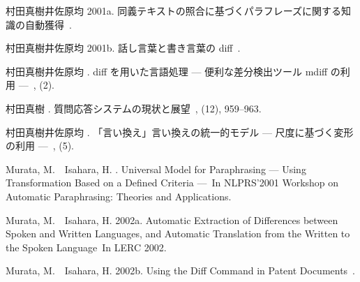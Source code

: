 \begin{thebibliography}{}
村田真樹\JBA  井佐原均 \BBOP 2001a\BBCP.
\newblock \JBOQ
  同義テキストの照合に基づくパラフレーズに関する知識の自動獲得\JBCQ\
\newblock {}.

村田真樹\JBA  井佐原均 \BBOP 2001b\BBCP.
\newblock \JBOQ 話し言葉と書き言葉の diff\JBCQ\
\newblock {}.

村田真樹\JBA  井佐原均 \BBOP 2002\BBCP.
\newblock \JBOQ diff を用いた言語処理 --- 便利な差分検出ツール mdiff の利用
  ---\JBCQ\
\newblock {}, {}  (2).

村田真樹 \BBOP 2003\BBCP.
\newblock \JBOQ 質問応答システムの現状と展望\JBCQ\
\newblock {}, {}  (12), 959--963.

村田真樹\JBA  井佐原均 \BBOP 2004\BBCP.
\newblock \JBOQ 「言い換え」言い換えの統一的モデル --- 尺度に基づく変形の利用
  ---\JBCQ\
\newblock \Jem{言語処理学会誌}, {}  (5).

Murata, M.\BBACOMMA\  \BBA\ Isahara, H. \BBOP 2001\BBCP.
\newblock \BBOQ Universal Model for Paraphrasing --- Using Transformation Based
  on a Defined Criteria ---\BBCQ\
\newblock In {\Bem NLPRS'2001 Workshop on Automatic Paraphrasing: Theories and
  Applications}.

Murata, M.\BBACOMMA\  \BBA\ Isahara, H. \BBOP 2002a\BBCP.
\newblock \BBOQ Automatic Extraction of Differences between Spoken and Written
  Languages, and Automatic Translation from the Written to the Spoken
  Language\BBCQ\
\newblock In {\Bem LERC 2002}.

Murata, M.\BBACOMMA\  \BBA\ Isahara, H. \BBOP 2002b\BBCP.
\newblock \BBOQ Using the Diff Command in Patent Documents\BBCQ\
.


\end{thebibliography}
